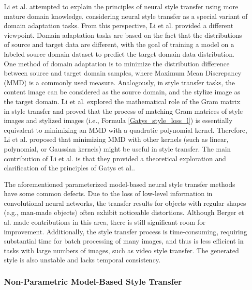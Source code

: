 \documentclass[preprint,12pt]{elsarticle}
\begin{document}
Li et al.\citep{28li2017demystifying} attempted to explain the principles of neural style transfer using more mature domain knowledge, considering neural style transfer as a special variant of domain adaptation tasks. From this perspective, Li et al. provided a different viewpoint. Domain adaptation tasks are based on the fact that the distributions of source and target data are different, with the goal of training a model on a labeled source domain dataset to predict the target domain data distribution. One method of domain adaptation is to minimize the distribution difference between source and target domain samples, where Maximum Mean Discrepancy (MMD) is a commonly used measure. Analogously, in style transfer tasks, the content image can be considered as the source domain, and the stylize image as the target domain. Li et al. explored the mathematical role of the Gram matrix in style transfer and proved that the process of matching Gram matrices of style images and stylized images (i.e., Formula \ref{Gatys_style_loss_l}) is essentially equivalent to minimizing an MMD with a quadratic polynomial kernel. Therefore, Li et al. proposed that minimizing MMD with other kernels (such as linear, polynomial, or Gaussian kernels) might be useful in style transfer. The main contribution of Li et al. is that they provided a theoretical exploration and clarification of the principles of Gatys et al.\citep{02gatys2016image}.

The aforementioned parameterized model-based neural style transfer methods have some common defects. Due to the loss of low-level information in convolutional neural networks, the transfer results for objects with regular shapes (e.g., man-made objects) often exhibit noticeable distortions. Although Berger et al.\citep{26berger2016incorporating} made contributions in this area, there is still significant room for improvement. Additionally, the style transfer process is time-consuming, requiring substantial time for batch processing of many images, and thus is less efficient in tasks with large numbers of images, such as video style transfer. The generated style is also unstable and lacks temporal consistency.

\subsubsection{Non-Parametric Model-Based Style Transfer}
\end{document}
